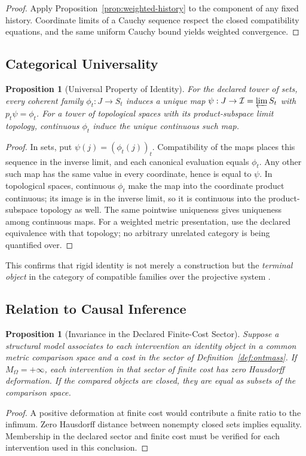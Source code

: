 \documentclass[11pt,a4paper]{article}
\theoremstyle{plain}
\newtheorem{proposition}[theorem]{Proposition}
\theoremstyle{definition}
\theoremstyle{remark}
\begin{document}
\begin{proof}
Apply Proposition~\ref{prop:weighted-history} to the component of any fixed history. Coordinate limits of a Cauchy sequence respect the closed compatibility equations, and the same uniform Cauchy bound yields weighted convergence.
\end{proof}

\subsection{Categorical Universality}

\begin{proposition}[Universal Property of Identity]
For the declared tower of sets, every coherent family $\phi_t:J\to S_t$
induces a unique map $\psi:J\to\mathcal I=\varprojlim S_t$ with
$p_t\psi=\phi_t$. For a tower of topological spaces with its product-subspace
limit topology, continuous $\phi_t$ induce the unique continuous such map.
\end{proposition}
\begin{proof}
In sets, put $\psi(j)=(\phi_t(j))_t$. Compatibility of the maps places this
sequence in the inverse limit, and each canonical evaluation equals $\phi_t$.
Any other such map has the same value in every coordinate, hence is equal
to $\psi$. In topological spaces, continuous $\phi_t$ make the map into
the coordinate product continuous; its image is in the inverse limit, so
it is continuous into the product-subspace topology as well. The same
pointwise uniqueness gives uniqueness among continuous maps. For a weighted
metric presentation, use the declared equivalence with that topology;
no arbitrary unrelated category is being quantified over.
\end{proof}

This confirms that rigid identity is not merely a construction but the \textit{terminal object} in the category of compatible families over the projective system \cite{maclane1998}.

\subsection{Relation to Causal Inference}

\begin{proposition}[Invariance in the Declared Finite-Cost Sector]
Suppose a structural model associates to each intervention an identity object in a common metric comparison space and a cost in the sector of Definition~\ref{def:ontmass}. If $M_\Omega=+\infty$, each intervention in that sector of finite cost has zero Hausdorff deformation. If the compared objects are closed, they are equal as subsets of the comparison space.
\end{proposition}
\begin{proof}
A positive deformation at finite cost would contribute a finite ratio to the infimum. Zero Hausdorff distance between nonempty closed sets implies equality. Membership in the declared sector and finite cost must be verified for each intervention used in this conclusion.
\end{proof}
\end{document}
